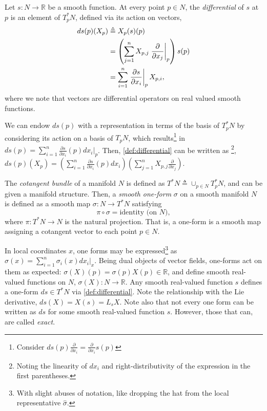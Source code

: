 \documentclass[psamsfonts]{amsart}
\theoremstyle{definition}
\theoremstyle{remark}
\newcommand*\R{\mathds{R}}
\newcommand*\isdefined{\triangleq}
\newcommand{\fracpartial}[2]{\frac{\partial #1}{\partial  #2}}
\numberwithin{equation}{section}
\begin{document}
 Let $s: N \rightarrow \R$ be a smooth function. At every point $p \in N$, the \textit{differential} of $s$ at $p$ is an element of $T^*_pN$, defined via its action on vectors, 
\begin{align}
    ds(p)(X_p) & \isdefined X_p(s)(p) \label{def:differential} \\%
     & = \left(\sum_{j = 1}^nX_{p, j}\left.\frac{\partial}{\partial x_j}\right\rvert_p\right)s(p) \notag \\
     & = \sum_{i = 1}^n \left.\frac{\partial s}{\partial x_i} \right\rvert_p X_{p, i}, \notag
\end{align}
where we note that vectors are differential operators on real valued smooth functions. 


We can endow $ds(p)$ with a representation in terms of the basis of $T^*_pN$ by considering its action on a basis of $T_pN$, which results\footnote{{\color{red}Consider $ds(p)\fracpartial{ }{x_i} = \fracpartial{}{x_i}s(p)$ }} in $ds(p) =\sum_{i = 1}^n \frac{\partial s}{\partial x_i}(p)dx_i\vert_p$. Then, \eqref{def:differential} can be written as \footnote{Noting the linearity of $dx_i$ and right-distributivity of the expression in the first parentheses.}, $ds(p)(X_p) = \left(\sum_{i = 1}^n \frac{\partial s}{\partial x_i}(p)dx_i  \right)\left(\sum_{j = 1}^nX_{p, j}\frac{\partial}{\partial x_j}\right)$. 

The \textit{cotangent bundle} of a manifold $N$ is defined as $T^*N \isdefined \cup_{p\in N}T_p^*N$, and can be given a manifold structure. Then, a \textit{smooth one-form} $\sigma$ on a smooth manifold $N$ is defined as a smooth map $\sigma : N \rightarrow T^*N$ satisfying $$\pi \circ \sigma = \text{identity (on } N),$$ where $\pi: T^*N \rightarrow N$ is the natural projection. That is, a one-form is a smooth map assigning a cotangent vector to each point $p\in N$.

In local coordinates $x$, one forms may be expressed\footnote{With slight abuses of notation, like dropping the hat from the local representative $\hat \sigma$.} as $\sigma(x) = \sum_{i=1}^n \sigma_i(x)dx_i\vert_{x}$. Being dual objects of vector fields, one-forms act on them as expected: $\sigma(X)(p) = \sigma(p)X(p) \in \R$, and define smooth real-valued functions on $N$, $\sigma(X) : N \rightarrow \R$. Any smooth real-valued function $s$ defines a one-form $ds\in T^*N$ via \eqref{def:differential}. Note the relationship with the Lie derivative, $ds(X) = X(s) = L_sX$. Note also that not every one form can be written as $ds$ for some smooth real-valued function $s$. However, those that can, are called \textit{exact}. 
\end{document}
